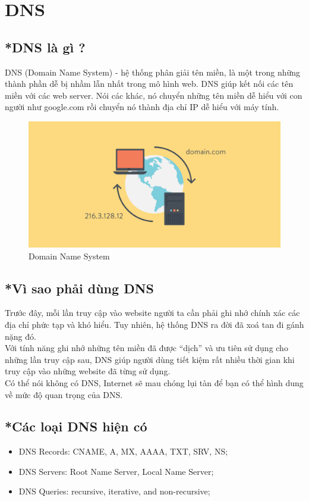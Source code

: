 \documentclass[APA,STIX1COL]{WileyNJD-v2}
\begin{document}
\section{DNS}
\subsection*{*DNS là gì ?}
DNS (Domain Name System) - hệ thống phân giải tên miền, là một trong những thành phần dễ bị nhầm lẫn nhất trong mô hình web. DNS giúp kết nối các tên miền với các web server. Nói các khác, nó chuyển những tên miền dễ hiểu với con người như google.com rồi chuyển nó thành địa chỉ IP dễ hiểu với máy tính.

\begin{figure}[h]
  \centering
  \includegraphics[scale=0.2]{dns}
  \caption{Domain Name System}
  \label{fig:imap}
\end{figure}

\subsection*{*Vì sao phải dùng DNS}
Trước đây, mỗi lần truy cập vào website người ta cần phải ghi nhớ chính xác các địa chỉ phức tạp và khó hiểu. Tuy nhiên, hệ thống DNS ra đời đã xoá tan đi gánh nặng đó. \\

Với tính năng ghi nhớ những tên miền đã được “dịch” và ưu tiên sử dụng cho những lần truy cập sau, DNS giúp người dùng tiết kiệm rất nhiều thời gian khi truy cập vào những website đã từng sử dụng.\\

Có thể nói không có DNS, Internet sẽ mau chóng lụi tàn để bạn có thể hình dung về mức độ quan trọng của DNS.
\subsection*{*Các loại DNS hiện có}
\begin{itemize}
  \item DNS Records: CNAME, A, MX, AAAA, TXT, SRV, NS;
  \item DNS Servers: Root Name Server, Local Name Server;
  \item DNS Queries: recursive, iterative, and non-recursive;
\end{itemize}
\end{document}
